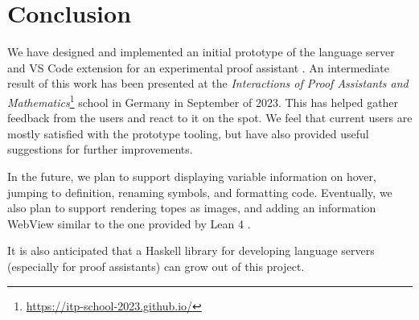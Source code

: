 \chapter{Conclusion}
\label{chap:conclusion}

We have designed and implemented an initial prototype of the language server
and VS Code extension for an experimental proof assistant \Rzk{}.
An intermediate result of this work has been presented at the
\textit{Interactions of Proof Assistants and Mathematics}\footnote{\url{https://itp-school-2023.github.io/}}
school in Germany in September of 2023.
This has helped gather feedback from the users and react to it on the spot.
We feel that current users are mostly satisfied with the prototype tooling,
but have also provided useful suggestions for further improvements.

In the future, we plan to support displaying variable information on hover,
jumping to definition, renaming symbols, and formatting \Rzk{} code.
Eventually, we also plan to support rendering topes as images,
and adding an information WebView similar to the one provided by Lean 4 \cite{Nawrocki2023}.

It is also anticipated that a Haskell library for developing language servers
(especially for proof assistants) can grow out of this project.
